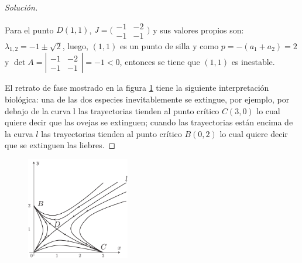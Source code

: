 \documentclass[a5paper,doc,10pt,noapacite]{apa6}
\begin{document}
{{\begin{proof}[Solución]
\begin{APAenumerate}
			\item Para el punto \(D(1,1)\), \(J=\Big(\begin{smallmatrix} -1 & -2 \\ -1 & -1 \end{smallmatrix}\Big) \) y sus valores propios son: \(\lambda_{1,2}=-1\pm\sqrt{2}\), luego, \((1,1)\) es un punto de silla y como \(p=-(a_1+a_2)=2\) y \(\det A=\left|\begin{smallmatrix} -1 & -2 \\ -1 & -1 \end{smallmatrix}\right|=-1<0\), entonces se tiene que \((1,1)\) es inestable.
		\end{APAenumerate}
	
	
	El retrato de fase mostrado en la figura \ref{fig:M-22} tiene la siguiente interpretación biológica: una de las dos especies 	inevitablemente se extingue, por ejemplo, por debajo de la curva l las trayectorias tienden al punto crítico \(C(3,0)\) lo cual quiere decir que las ovejas se extinguen; cuando las trayectorias están encima de la curva \(l\) las trayectorias tienden al punto crítico \(B(0,2)\) lo cual quiere decir que se extinguen las liebres.
	
	
	\end{proof}
	\newpage
%
	
	\begin{figure}[H]
		\captionsetup{justification=centering, labelfont=footnotesize, font=footnotesize}
		\centering
		\includegraphics[width=4.5cm]{Graficos/figura22}
	
		\caption{ }
		\label{fig:M-22}
	\end{figure}


}}
\end{document}
